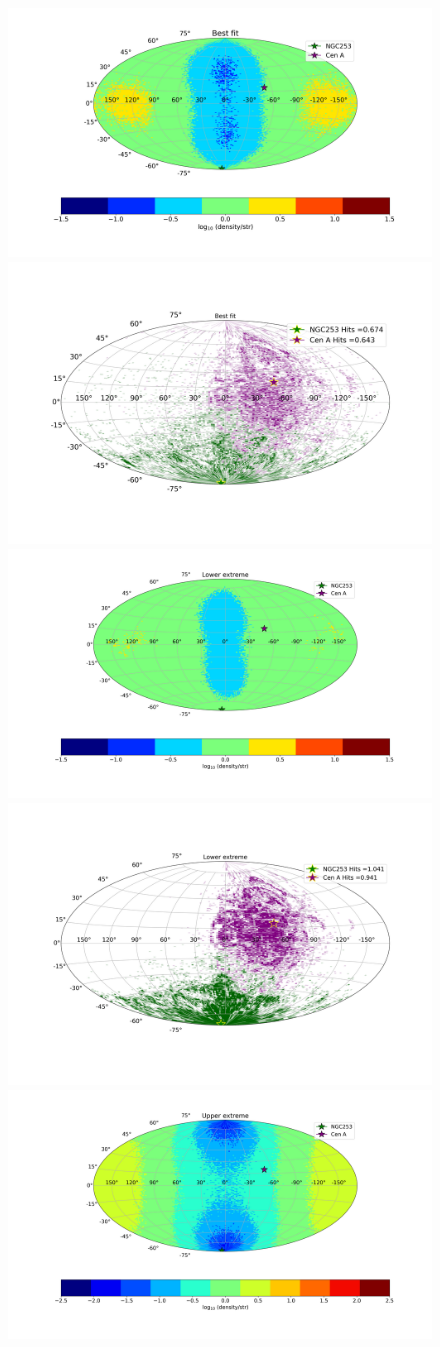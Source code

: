 \documentclass[12pt, a4 paper]{mnras}
\begin{document}
\centering
\begin{figure}
\includegraphics[width=0.49\linewidth]{Images/Log_Bins_180_Historgam_BF_N2_Str_Tur_TM_40_EeV.png}
\includegraphics[width=0.49\linewidth]{Images/Bins_180_BF_N2_CenA_NGC253_Str_Tur_TM_40_EeV.png}\\
\includegraphics[width=0.49\linewidth]{Images/Log_Bins_180_Historgam_LB_N2_Str_Tur_TM_40_EeV.png}
\includegraphics[width=0.49\linewidth]{Images/Bins_180_LB_N2_CenA_NGC253_Str_Tur_TM_40_EeV.png}\\
\includegraphics[width=0.49\linewidth]{Images/Log_Bins_180_Historgam_UB_N2_Str_Tur_TM_40_EeV.png}

\end{figure}
\end{document}
